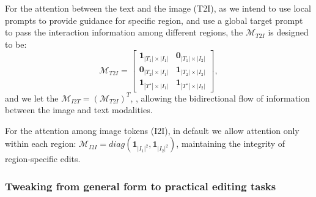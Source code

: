 \documentclass{article}
\begin{document}
For the attention between the text and the image (T2I), as we intend to use local prompts to provide guidance for specific region, and use a global target prompt to pass the interaction information among different regions, the $\mathcal{M}_{T2I}$ is designed to be:
\begin{equation*}
    \mathcal{M}_{T2I} = \begin{bmatrix}
        \mathbf{1}_{|T_1|\times|I_1|} &  \mathbf{0}_{|T_1|\times|I_2|}\\
        \mathbf{0}_{|T_2|\times|I_1|} &  \mathbf{1}_{|T_2|\times|I_2|}\\
         \mathbf{1}_{|T^\star|\times|I_1|} &  \mathbf{1}_{|T^\star|\times|I_2|}
    \end{bmatrix},
\end{equation*}
and we let the $\mathcal{M}_{I2T}=(\mathcal{M}_{T2I})^T$, , allowing the bidirectional flow of information between the image and text modalities.

For the attention among image tokens (I2I), in default we allow attention only within each region: $\mathcal{M}_{I2I}=diag(\mathbf{1}_{|I_1|^2}, \mathbf{1}_{|I_2|^2})$, maintaining the integrity of region-specific edits.

\subsubsection{Tweaking from general form to practical editing tasks}
\end{document}
